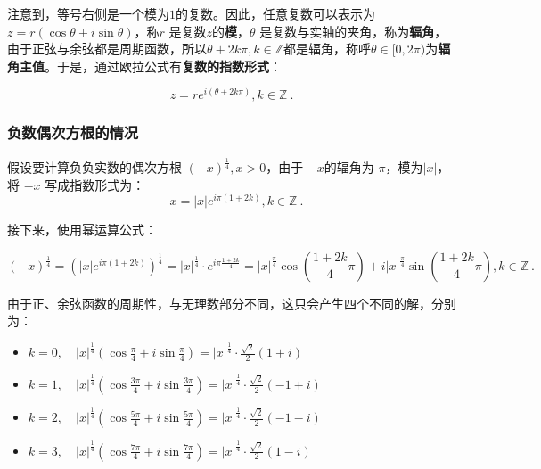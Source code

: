 注意到，等号右侧是一个模为$1$的复数。因此，任意复数可以表示为 $z = r (\cos \theta + i \sin \theta)$，称$r$ 是复数$z$的\textbf{模}，$\theta$ 是复数与实轴的夹角，称为\textbf{辐角}，由于正弦与余弦都是周期函数，所以$\theta+2k\pi,k\in\mathbb{Z}$都是辐角，称呼$\theta\in[0,2\pi)$为\textbf{辐角主值}。于是，通过欧拉公式有\textbf{复数的指数形式}：

\begin{equation}
z = r e^{i(\theta+2k\pi)},k\in\mathbb{Z}~.
\end{equation}

\subsubsection{负数偶次方根的情况}

假设要计算负负实数的偶次方根 $(-x)^{\frac{1}{4}},x>0$，由于 $-x$的辐角为 $\pi$，模为$|x|$，将 $-x$ 写成指数形式为：
\begin{equation}
-x = |x| e^{i\pi(1+2k)},k\in\mathbb{Z}~.
\end{equation}

接下来，使用幂运算公式：

\begin{equation}
\displaystyle
(-x)^{\frac{1}{4}} = \left( |x| e^{i\pi(1+2k)} \right)^{\frac{1}{4}} =|x|^{\frac{1}{4}} \cdot e^{i\pi\frac{1+2k}{4}}=|x|^{\frac{\pi}{4}}\cos(\frac{1+2k}{4}\pi) + i|x|^{\frac{\pi}{4}}\sin(\frac{1+2k}{4}\pi),k\in\mathbb{Z}~.
\end{equation}

由于正、余弦函数的周期性，与无理数部分不同，这只会产生四个不同的解，分别为：

\begin{itemize}
\item $\displaystyle k = 0,\quad |x|^{\frac{1}{4}} \left( \cos\frac{\pi}{4} + i\sin\frac{\pi}{4} \right) = |x|^{\frac{1}{4}} \cdot \frac{\sqrt{2}}{2} \left( 1 + i \right)$
\item $\displaystyle k = 1,\quad |x|^{\frac{1}{4}} \left( \cos\frac{3\pi}{4} + i\sin\frac{3\pi}{4} \right) = |x|^{\frac{1}{4}} \cdot \frac{\sqrt{2}}{2} \left( -1 +i \right)$
\item $\displaystyle k = 2,\quad |x|^{\frac{1}{4}} \left( \cos\frac{5\pi}{4} + i\sin\frac{5\pi}{4} \right) = |x|^{\frac{1}{4}} \cdot \frac{\sqrt{2}}{2} \left( -1 - i \right)$
\item $\displaystyle k = 3,\quad |x|^{\frac{1}{4}} \left( \cos\frac{7\pi}{4} + i\sin\frac{7\pi}{4} \right) = |x|^{\frac{1}{4}} \cdot \frac{\sqrt{2}}{2} \left( 1 - i \right)$
\end{itemize}


